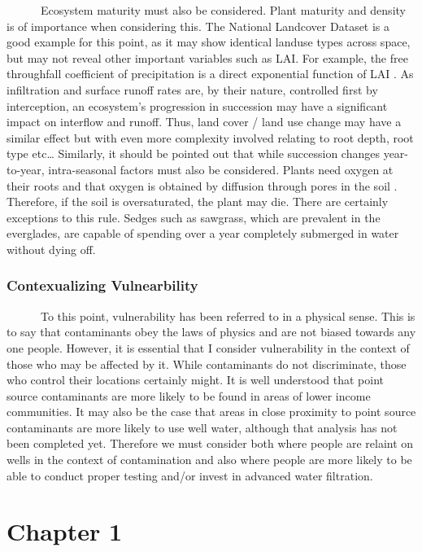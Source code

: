 \documentclass[
]{book}
\begin{document}
~~~~~~Ecosystem maturity must also be considered. Plant maturity and density is of importance when considering this. The National Landcover Dataset is a good example for this point, as it may show identical landuse types across space, but may not reveal other important variables such as LAI. For example, the free throughfall coefficient of precipitation is a direct exponential function of LAI \citep{pitman1989rainfall}. As infiltration and surface runoff rates are, by their nature, controlled first by interception, an ecosystem's progression in succession may have a significant impact on interflow and runoff. Thus, land cover / land use change may have a similar effect but with even more complexity involved relating to root depth, root type etc\ldots{} Similarly, it should be pointed out that while succession changes year-to-year, intra-seasonal factors must also be considered. Plants need oxygen at their roots and that oxygen is obtained by diffusion through pores in the soil \citep{hornberger2014elements}. Therefore, if the soil is oversaturated, the plant may die. There are certainly exceptions to this rule. Sedges such as sawgrass, which are prevalent in the everglades, are capable of spending over a year completely submerged in water without dying off.

\hypertarget{contexualizing-vulnearbility}{%
\subsection{Contexualizing Vulnearbility}\label{contexualizing-vulnearbility}}

~~~~~~To this point, vulnerability has been referred to in a physical sense. This is to say that contaminants obey the laws of physics and are not biased towards any one people. However, it is essential that I consider vulnerability in the context of those who may be affected by it. While contaminants do not discriminate, those who control their locations certainly might. It is well understood that point source contaminants are more likely to be found in areas of lower income communities. It may also be the case that areas in close proximity to point source contaminants are more likely to use well water, although that analysis has not been completed yet. Therefore we must consider both where people are relaint on wells in the context of contamination and also where people are more likely to be able to conduct proper testing and/or invest in advanced water filtration.

\hypertarget{chapter1}{%
\chapter{Chapter 1}\label{chapter1}}
\end{document}
